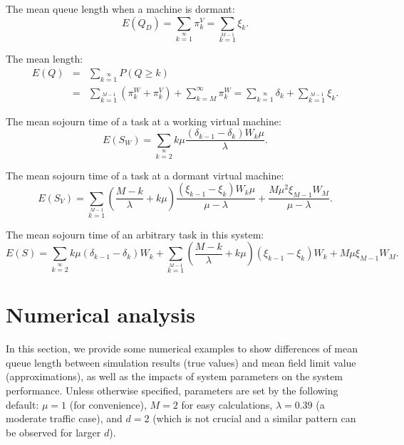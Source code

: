\documentclass[12pt]{article}
\begin{document}
The mean queue length when a machine is dormant:
\begin{equation}
  E(Q_D)=\sum\limits_{k=1}\limits^{\infty}\pi_{k}^{V}=\sum\limits_{k=1}\limits^{M-1}\xi_k.
\end{equation}

The mean length:
\begin{eqnarray}
  \nonumber E(Q)&=&\sum\limits_{k=1}\limits^{\infty}P(Q\geq k)\\
  &=&\sum\limits_{k=1}\limits^{M-1}(\pi_k^W+\pi_k^V)+\sum\limits_{k=M}^{\infty}\pi_k^W=\sum\limits_{k=1}\limits^{\infty}\delta_k+
  \sum\limits_{k=1}\limits^{M-1}\xi_k.
\end{eqnarray}

The mean sojourn time of a task at a working virtual machine:
\begin{equation}
E(S_W)=\sum\limits_{k=2}\limits^{\infty}k\mu\frac{(\delta_{k-1}-\delta_{k})W_{k}\mu}{\lambda}.
\end{equation}

The mean sojourn time of a task at a dormant virtual machine:
\begin{equation}
  E(S_V)=\sum\limits_{k=1}\limits^{M-1}(\frac{M-k}{\lambda}+k\mu)\frac{(\xi_{k-1}-\xi_{k})W_{k}\mu}{\mu-\lambda}+\frac{M\mu^2\xi_{M-1}W_{M}}{\mu-\lambda}.
\end{equation}

The mean sojourn time of an arbitrary task in this system:
\begin{equation}
 E(S)=\sum\limits_{k=2}\limits^{\infty}k\mu(\delta_{k-1}-\delta_{k})W_{k}+\sum\limits_{k=1}\limits^{M-1}(\frac{M-k}{\lambda}+k\mu)(\xi_{k-1}-\xi_{k})W_{k}+M\mu\xi_{M-1}W_{M}.
\end{equation}


\section{Numerical analysis}

In this section, we provide some numerical examples to show differences of mean queue length between simulation results (true values) and mean field limit value (approximations), as well as the impacts of system parameters on the system performance. Unless otherwise specified, parameters are set by the following default: $\mu=1$ (for convenience), $M=2$ for easy calculations, $\lambda=0.39$ (a moderate traffic case), and $d=2$ (which is not crucial and a similar pattern can be observed for larger $d$).
\end{document}
